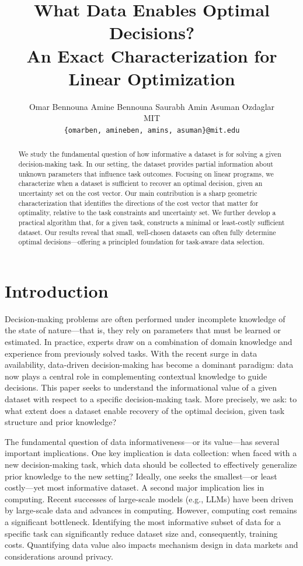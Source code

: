 \documentclass[11pt]{article}
\title{What Data Enables Optimal Decisions? \\An Exact Characterization for Linear Optimization
}
\author{
\vspace{0.1in}
Omar Bennouna 
\; Amine Bennouna
\; Saurabh Amin
\; Asuman Ozdaglar\\
MIT\\
\texttt{\{omarben, amineben, amins, asuman\}@mit.edu}
}
\date{}
\theoremstyle{plain}
\theoremstyle{definition}
\begin{document}
\maketitle

\begin{abstract}
We study the fundamental question of how informative a dataset is for solving a given decision-making task. In our setting, the dataset provides partial information about unknown parameters that influence task outcomes. Focusing on linear programs, we characterize when a dataset is sufficient to recover an optimal decision, given an uncertainty set on the cost vector. Our main contribution is a sharp geometric characterization that identifies the directions of the cost vector that matter for optimality, relative to the task constraints and uncertainty set.
We further develop a practical algorithm that, for a given task, constructs a minimal or least-costly sufficient dataset. 
Our results reveal that small, well-chosen datasets can often fully determine optimal decisions---offering a principled foundation for task-aware data selection.
\end{abstract}


\section{Introduction}
\label{sec:intro}
Decision-making problems are often performed under incomplete knowledge of the state of nature---that is, they rely on parameters that must be learned or estimated. In practice, experts draw on a combination of domain knowledge and experience from previously solved tasks. With the recent surge in data availability, data-driven decision-making has become a dominant paradigm: data now plays a central role in complementing contextual knowledge to guide decisions.
This paper seeks to understand the informational value of a given dataset with respect to a specific decision-making task. More precisely, we ask: to what extent does a dataset enable recovery of the optimal decision, given task structure and prior knowledge?


The fundamental question of data informativeness---or its value---has several important implications. One key implication is data collection: when faced with a new decision-making task, which data should be collected to effectively generalize prior knowledge to the new setting? Ideally, one seeks the smallest---or least costly---yet most informative dataset. A second major implication lies in computing. Recent successes of large-scale models (e.g., LLMs) have been driven by large-scale data and advances in computing. However, computing cost remains a significant bottleneck. Identifying the most informative subset of data for a specific task can significantly reduce dataset size and, consequently, training costs. 
Quantifying data value also impacts mechanism design in data markets and considerations around privacy.
\end{document}
